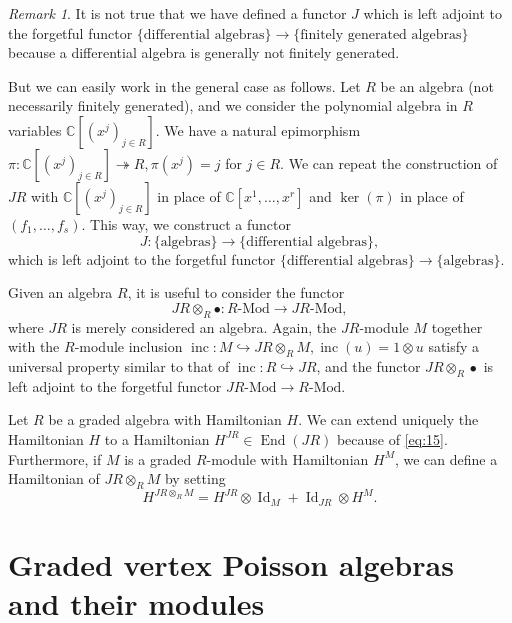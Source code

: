 \documentclass[a4paper, 12pt, reqno]{amsart}
\theoremstyle{remark}
\newtheorem{remark}[theorem]{Remark}
\DeclareMathOperator{\End}{End}
\DeclareMathOperator{\Id}{Id}
\DeclareMathOperator{\inc}{inc}
\begin{document}
\begin{remark}
  \label{rmk:8}
  It is not true that we have defined a functor $J$ which is left adjoint to the forgetful functor $\{\text{differential algebras}\} \to \{\text{finitely generated algebras}\}$ because a differential algebra is generally not finitely generated.

  But we can easily work in the general case as follows.
  Let $R$ be an algebra (not necessarily finitely generated), and we consider the polynomial algebra in $R$ variables $\mathbb{C}[(x^j)_{j \in R}]$.
  We have a natural epimorphism $\pi: \mathbb{C}[(x^j)_{j \in R}] \twoheadrightarrow R, \pi(x^j) = j$ for $j \in R$.
  We can repeat the construction of $JR$ with $\mathbb{C}[(x^j)_{j \in R}]$ in place of $\mathbb{C}[x^1, \dots, x^r]$ and $\ker(\pi)$ in place of $(f_1, \dots, f_s)$.
  This way, we construct a functor
  \begin{equation*}
    J: \{\text{algebras}\} \to \{\text{differential algebras}\},
  \end{equation*}
  which is left adjoint to the forgetful functor $\{\text{differential algebras}\} \to \{\text{algebras}\}$.
\end{remark}

Given an algebra $R$, it is useful to consider the functor
\begin{equation*}
  JR \otimes_R \bullet: \text{$R$-Mod} \to \text{$JR$-Mod},
\end{equation*}
where $JR$ is merely considered an algebra.
Again, the $JR$-module $M$ together with the $R$-module inclusion $\inc: M \hookrightarrow JR \otimes_R M, \inc(u) = 1\otimes u$ satisfy a universal property similar to that of $\inc: R \hookrightarrow JR$, and the functor $JR \otimes_R \bullet$ is left adjoint to the forgetful functor $\text{$JR$-Mod} \to \text{$R$-Mod}$.

Let $R$ be a graded algebra with Hamiltonian $H$.
We can extend uniquely the Hamiltonian $H$ to a Hamiltonian $H^{JR} \in \End(JR)$ because of \eqref{eq:15}.
Furthermore, if $M$ is a graded $R$-module with Hamiltonian $H^M$, we can define a Hamiltonian of $JR \otimes_R M$ by setting
\begin{equation*}
  H^{JR \otimes_R M} = H^{JR}\otimes\Id_{M} + \Id_{JR}\otimes H^M.
\end{equation*}

\section{Graded vertex Poisson algebras and their modules}
\label{sec:graded-vert-poiss}
\end{document}
